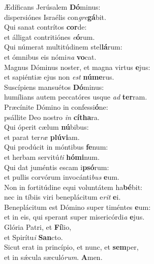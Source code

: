 \evenverse Ædíficans Jerúsalem \textbf{Dó}minus:~\*\\
\evenverse dispersiónes Israélis con\textit{gre}\textbf{gá}bit.\\
\oddverse Qui sanat contrítos \textbf{cor}de:~\*\\
\oddverse et álligat contritiónes \textit{e}\textbf{ó}rum.\\
\evenverse Qui númerat multitúdinem stel\textbf{lá}rum:~\*\\
\evenverse et ómnibus eis nómi\textit{na} \textbf{vo}cat.\\
\oddverse Magnus Dóminus noster, et magna virtus \textbf{e}jus:~\*\\
\oddverse et sapiéntiæ ejus non \textit{est} \textbf{nú}\textbf{me}rus.\\
\evenverse Suscípiens mansuétos \textbf{Dó}minus:~\*\\
\evenverse humílians autem peccatóres usque \textit{ad} \textbf{ter}ram.\\
\oddverse Præcínite Dómino in confessi\textbf{ó}ne:~\*\\
\oddverse psállite Deo nostro \textit{in} \textbf{cí}\textbf{tha}ra.\\
\evenverse Qui óperit cælum \textbf{nú}bibus:~\*\\
\evenverse et parat ter\textit{ræ} \textbf{plú}\textbf{vi}am.\\
\oddverse Qui prodúcit in móntibus \textbf{fe}num:~\*\\
\oddverse et herbam servitú\textit{ti} \textbf{hó}\textbf{mi}num.\\
\evenverse Qui dat juméntis escam i\textbf{psó}rum:~\*\\
\evenverse et pullis corvórum invocánti\textit{bus} \textbf{e}um.\\
\oddverse Non in fortitúdine equi voluntátem ha\textbf{bé}bit:~\*\\
\oddverse nec in tíbiis viri beneplácitum e\textit{rit} \textbf{e}i.\\
\evenverse Beneplácitum est Dómino super timéntes \textbf{e}um:~\*\\
\evenverse et in eis, qui sperant super misericórdi\textit{a} \textbf{e}jus.\\
\oddverse Glória Patri, et \textbf{Fí}lio,~\*\\
\oddverse et Spirítu\textit{i} \textbf{San}cto.\\
\evenverse Sicut erat in princípio, et nunc, et \textbf{sem}per,~\*\\
\evenverse et in sǽcula sæculó\textit{rum}. \textbf{A}men.\\
